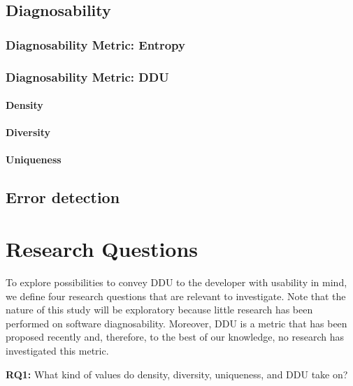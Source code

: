 \documentclass[twoside,a4paper,11pt]{memoir}
\begin{document}
\section{Diagnosability}

\subsection{Diagnosability Metric: Entropy}
\subsection{Diagnosability Metric: DDU}

\subsubsection{Density}

\subsubsection{Diversity}

\subsubsection{Uniqueness}

\section{Error detection}


\chapter{Research Questions}
\label{ch:research_questions}
To explore possibilities to convey DDU to the developer with usability in mind, we define four research questions that are relevant to investigate.
Note that the nature of this study will be exploratory because little research has been performed on software diagnosability.
Moreover, DDU is a metric that has been proposed recently \cite{DBLP:conf/icse/PerezAD17} and, therefore, to the best of our knowledge, no research has investigated this metric.

\begin{framed}
\noindent
\textbf{RQ1:} What kind of values do density, diversity, uniqueness, and DDU take on?
\end{framed}
\end{document}
